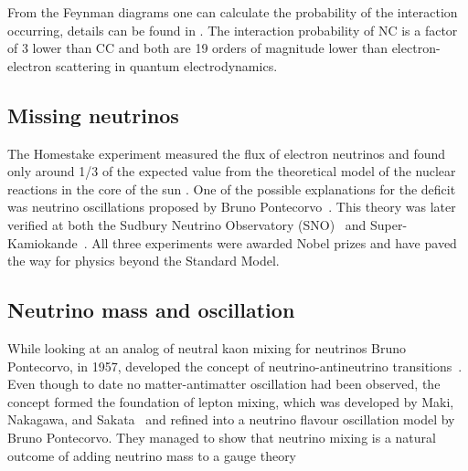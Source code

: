 From the Feynman diagrams one can calculate the probability of the interaction occurring, details can be found in \cite{3Peskin}. The interaction probability of NC is a factor of 3 lower than CC and both are 19 orders of magnitude lower than electron-electron scattering in quantum electrodynamics. 

\subsection{Missing neutrinos}

The Homestake experiment measured the flux of electron neutrinos and found only around 1/3 of the expected value from the theoretical model of the nuclear reactions in the core of the sun \cite{9Davis}. One of the possible explanations for the deficit was neutrino oscillations proposed by Bruno Pontecorvo~\cite{11Pontecorvo}. This theory was later verified at both the Sudbury Neutrino Observatory (SNO)~\cite{Fix6} and Super-Kamiokande~\cite{10Fukuda}. All three experiments were awarded Nobel prizes and have paved the way for physics beyond the Standard Model.

\subsection{Neutrino mass and oscillation}\label{subsection:Neutrino mass and oscillation}
While looking at an analog of neutral kaon mixing for neutrinos Bruno Pontecorvo, in 1957, developed the concept of neutrino-antineutrino transitions~\cite{11Pontecorvo}. Even though to date no matter-antimatter oscillation had been observed, the concept formed the foundation of lepton mixing, which was developed by Maki, Nakagawa, and Sakata~\cite{12Maki} and refined into a neutrino flavour oscillation model by Bruno Pontecorvo. They managed to show that neutrino mixing is a natural outcome of adding neutrino mass to a gauge theory~\cite{11Pontecorvo}

